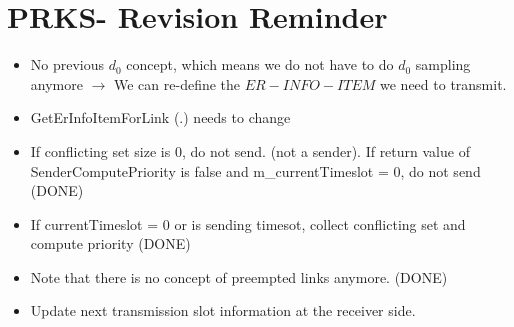 \section {PRKS- Revision Reminder}
\begin{itemize}
  \item No previous $d_0$ concept, which means we do not have to do $d_0$ sampling anymore $\rightarrow$ We can re-define the $ER-INFO-ITEM$ we need to transmit.
  \item GetErInfoItemForLink (.) needs to change
  \item If conflicting set size is 0, do not send. (not a sender). If return value of SenderComputePriority is false and m\_currentTimeslot = 0, do not send (DONE)
  \item If currentTimeslot = 0 or is sending timesot, collect conflicting set and compute priority (DONE)
  \item Note that there is no concept of preempted links anymore. (DONE)
  \item Update next transmission slot information at the receiver side. 
\end{itemize}
